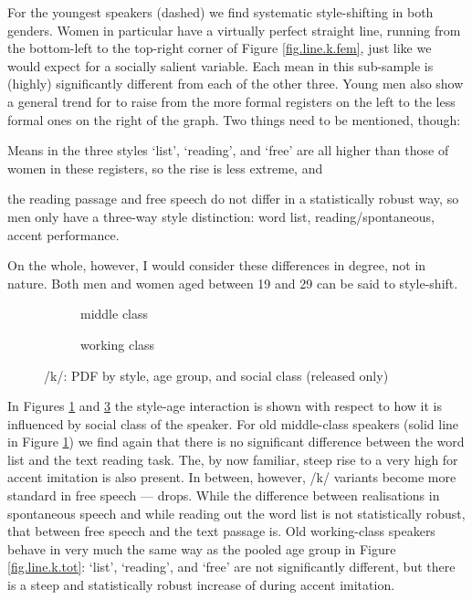 For the youngest speakers (dashed) we find systematic style-shifting in both genders.
Women in particular have a virtually perfect straight line, running from the bottom-left to the top-right corner of Figure \ref{fig.line.k.fem}, just like we would expect for a socially salient variable.
Each mean in this sub-sample is (highly) significantly different from each of the other three.
Young men also show a general trend for  to raise from the more formal registers on the left to the less formal ones on the right of the graph.
Two things need to be mentioned, though:
\begin{inparaenum}[(1)]
	\item Means in the three styles `list', `reading', and `free' are all higher than those of women in these registers, so the rise is less extreme, and
	\item the reading passage and free speech do not differ in a statistically robust way, so men only have a three-way style distinction: word list, reading/spontaneous, accent performance.
\end{inparaenum}
On the whole, however, I would consider these differences in degree, not in nature.
Both men and women aged between 19 and 29 can be said to style-shift.

\begin{figure}[h]
	\centering
	\begin{subfigure}{.49\textwidth}
		\centering
			\resizebox{\linewidth}{!}{} 
		\caption{middle class}
		\label{fig.line.k.mc}
	\end{subfigure}
	\begin{subfigure}{.49\textwidth}
		\centering
			\resizebox{\linewidth}{!}{} 
		\caption{working class}
		\label{fig.line.k.wc}
	\end{subfigure}
	\caption{/k/: PDF by style, age group, and social class (released only)}
\end{figure}

In Figures \ref{fig.line.k.mc} and \ref{fig.line.k.wc} the style-age interaction is shown with respect to how it is influenced by social class of the speaker.
For old middle-class speakers (solid line in Figure \ref{fig.line.k.mc}) we find again that there is no significant difference between the word list and the text reading task.
The, by now familiar, steep rise to a very high  for accent imitation is also present.
In between, however, /k/ variants become more standard in free speech ---  drops.
While the difference between realisations in spontaneous speech and while reading out the word list is not statistically robust, that between free speech and the text passage is.
Old working-class speakers behave in very much the same way as the pooled age group in Figure \ref{fig.line.k.tot}: `list', `reading', and `free' are not significantly different, but there is a steep and statistically robust increase of  during accent imitation.

